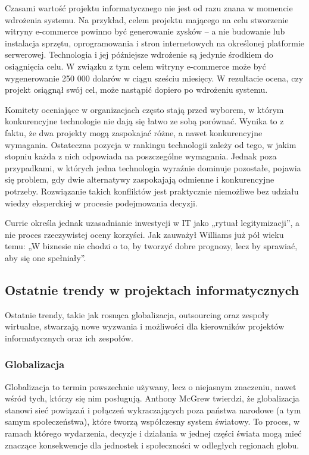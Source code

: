 Czasami wartość projektu informatycznego nie jest od razu znana w momencie wdrożenia systemu. Na przykład, celem projektu mającego na celu stworzenie witryny e-commerce powinno być generowanie zysków – a nie budowanie lub instalacja sprzętu, oprogramowania i stron internetowych na określonej platformie serwerowej. Technologia i jej późniejsze wdrożenie są jedynie środkiem do osiągnięcia celu. W związku z tym celem witryny e-commerce może być wygenerowanie 250 000 dolarów w ciągu sześciu miesięcy. W rezultacie ocena, czy projekt osiągnął swój cel, może nastąpić dopiero po wdrożeniu systemu.\autocite{ITPMMarchewka}

Komitety oceniające w organizacjach często stają przed wyborem, w którym konkurencyjne technologie nie dają się łatwo ze sobą porównać. Wynika to z faktu, że dwa projekty mogą zaspokajać różne, a nawet konkurencyjne wymagania. Ostateczna pozycja w rankingu technologii zależy od tego, w jakim stopniu każda z nich odpowiada na poszczególne wymagania. Jednak poza przypadkami, w których jedna technologia wyraźnie dominuje pozostałe, pojawia się problem, gdy dwie alternatywy zaspokajają odmienne i konkurencyjne potrzeby. Rozwiązanie takich konfliktów jest praktycznie niemożliwe bez udziału wiedzy eksperckiej w procesie podejmowania decyzji.\autocite{thomaidis2006evaluation}

Currie określa jednak uzasadnianie inwestycji w IT jako „rytuał legitymizacji”, a nie proces rzeczywistej oceny korzyści.\autocite{Currie1989} Jak zauważył Williams już pół wieku temu: „W biznesie nie chodzi o to, by tworzyć dobre prognozy, lecz by sprawiać, aby się one spełniały”.\autocite{williams1967technology}

\subsection{Ostatnie trendy w projektach informatycznych}
Ostatnie trendy, takie jak rosnąca globalizacja, outsourcing oraz zespoły wirtualne, stwarzają nowe wyzwania i możliwości dla kierowników projektów informatycznych oraz ich zespołów.\autocite{ITPM}

\subsubsection{Globalizacja}
Globalizacja to termin powszechnie używany, lecz o niejasnym znaczeniu, nawet wśród tych, którzy się nim posługują.\autocite{robertson2007globalization} Anthony McGrew twierdzi, że globalizacja stanowi sieć powiązań i połączeń wykraczających poza państwa narodowe (a tym samym społeczeństwa), które tworzą współczesny system światowy. To proces, w ramach którego wydarzenia, decyzje i działania w jednej części świata mogą mieć znaczące konsekwencje dla jednostek i społeczności w odległych regionach globu.\autocite{McGrew1990}

